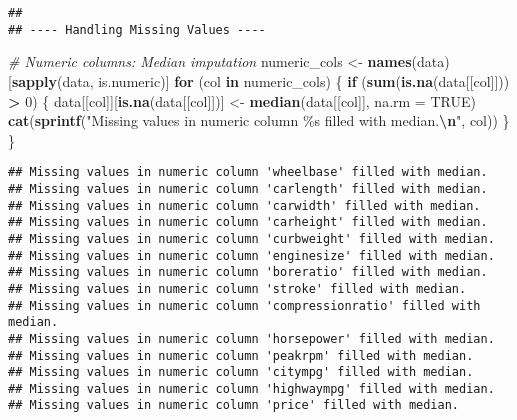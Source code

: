 \documentclass[
]{article}
\newenvironment{Shaded}{\begin{snugshade}}{\end{snugshade}}
\newcommand{\AttributeTok}[1]{\textcolor[rgb]{0.13,0.29,0.53}{#1}}
\newcommand{\CommentTok}[1]{\textcolor[rgb]{0.56,0.35,0.01}{\textit{#1}}}
\newcommand{\ConstantTok}[1]{\textcolor[rgb]{0.56,0.35,0.01}{#1}}
\newcommand{\ControlFlowTok}[1]{\textcolor[rgb]{0.13,0.29,0.53}{\textbf{#1}}}
\newcommand{\DecValTok}[1]{\textcolor[rgb]{0.00,0.00,0.81}{#1}}
\newcommand{\FunctionTok}[1]{\textcolor[rgb]{0.13,0.29,0.53}{\textbf{#1}}}
\newcommand{\NormalTok}[1]{#1}
\newcommand{\OtherTok}[1]{\textcolor[rgb]{0.56,0.35,0.01}{#1}}
\newcommand{\SpecialCharTok}[1]{\textcolor[rgb]{0.81,0.36,0.00}{\textbf{#1}}}
\newcommand{\StringTok}[1]{\textcolor[rgb]{0.31,0.60,0.02}{#1}}
\begin{document}
\begin{verbatim}
## 
## ---- Handling Missing Values ----
\end{verbatim}

\begin{Shaded}
\begin{Highlighting}[]
\CommentTok{\# Numeric columns: Median imputation}
\NormalTok{numeric\_cols }\OtherTok{\textless{}{-}} \FunctionTok{names}\NormalTok{(data)[}\FunctionTok{sapply}\NormalTok{(data, is.numeric)]}
\ControlFlowTok{for}\NormalTok{ (col }\ControlFlowTok{in}\NormalTok{ numeric\_cols) \{}
  \ControlFlowTok{if}\NormalTok{ (}\FunctionTok{sum}\NormalTok{(}\FunctionTok{is.na}\NormalTok{(data[[col]])) }\SpecialCharTok{\textgreater{}} \DecValTok{0}\NormalTok{) \{}
\NormalTok{    data[[col]][}\FunctionTok{is.na}\NormalTok{(data[[col]])] }\OtherTok{\textless{}{-}} \FunctionTok{median}\NormalTok{(data[[col]], }\AttributeTok{na.rm =} \ConstantTok{TRUE}\NormalTok{)}
    \FunctionTok{cat}\NormalTok{(}\FunctionTok{sprintf}\NormalTok{(}\StringTok{"Missing values in numeric column \textquotesingle{}\%s\textquotesingle{} filled with median.}\SpecialCharTok{\textbackslash{}n}\StringTok{"}\NormalTok{, col))}
\NormalTok{  \}}
\NormalTok{\}}
\end{Highlighting}
\end{Shaded}

\begin{verbatim}
## Missing values in numeric column 'wheelbase' filled with median.
## Missing values in numeric column 'carlength' filled with median.
## Missing values in numeric column 'carwidth' filled with median.
## Missing values in numeric column 'carheight' filled with median.
## Missing values in numeric column 'curbweight' filled with median.
## Missing values in numeric column 'enginesize' filled with median.
## Missing values in numeric column 'boreratio' filled with median.
## Missing values in numeric column 'stroke' filled with median.
## Missing values in numeric column 'compressionratio' filled with median.
## Missing values in numeric column 'horsepower' filled with median.
## Missing values in numeric column 'peakrpm' filled with median.
## Missing values in numeric column 'citympg' filled with median.
## Missing values in numeric column 'highwaympg' filled with median.
## Missing values in numeric column 'price' filled with median.
\end{verbatim}
\end{document}
